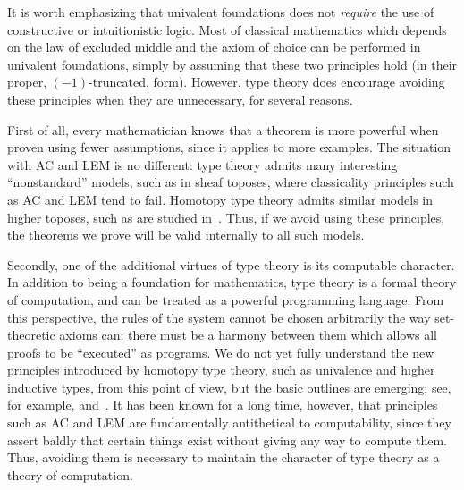 It is worth emphasizing that univalent foundations does not \emph{require} the use of constructive or intuitionistic logic.
Most of classical mathematics which depends on the law of excluded middle and the axiom of choice can be performed in univalent foundations, simply by assuming that these two principles hold (in their proper, $(-1)$-truncated, form).
However, type theory does encourage avoiding these principles when they are unnecessary, for several reasons.

First of all, every mathematician knows that a theorem is more powerful when proven using fewer assumptions, since it applies to more examples.
The situation with AC and LEM is no different:
type theory admits many interesting ``nonstandard'' models, such as in sheaf toposes, where classicality principles such as AC and LEM tend to fail.
Homotopy type theory admits similar models in higher toposes, such as are studied in~\cite{ToenVezzosi02,Rezk05,lurie:higher-topoi}.
Thus, if we avoid using these principles, the theorems we prove will be valid internally to all such models.

Secondly, one of the additional virtues of type theory is its computable character.
In addition to being a foundation for mathematics, type theory is a formal theory of computation, and can be treated as a powerful programming language.
From this perspective, the rules of the system cannot be chosen arbitrarily the way set-theoretic axioms can: there must be a harmony between them which allows all proofs to be ``executed'' as programs.
We do not yet fully understand the new principles introduced by homotopy type theory, such as univalence and higher inductive types, from
this point of view, but the basic outlines are emerging; see, for example,  and~\cite{lh:canonicity}.
It has been known for a long time, however, that principles such as AC and LEM are fundamentally antithetical to computability, since they assert baldly that certain things exist without giving any way to compute them.
Thus, avoiding them is necessary to maintain the character of type theory as a theory of computation.

